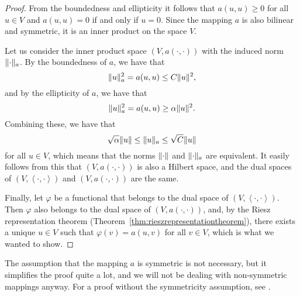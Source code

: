 \documentclass[english, 12pt, a4paper, sci, utf8, a-2b, online]{aaltothesis}
\theoremstyle{definition}
\theoremstyle{plain}
\DeclarePairedDelimiter\norm{\lVert}{\rVert}
\newcommand*{\innerprod}[2]{\left\langle #1, #2 \right\rangle}
\numberwithin{equation}{section}
\begin{document}
\begin{proof}
    From the boundedness and ellipticity it follows that $a(u,u) \geq 0$ for all $u \in V$ and
    $a(u,u) = 0$ if and only if $u=0$.
    Since the mapping $a$ is also bilinear and symmetric, it is
    an inner product on the space $V$.
    
    Let us consider the inner product space $(V, a(\cdot,\cdot))$
    with the induced norm $\norm{\cdot}_a$.
    By the boundedness of $a$, we have that
    \begin{equation*}
        \norm{u}_a^2
        = a(u,u)
        \leq C \norm{u}^2,
    \end{equation*}
    and by the ellipticity of $a$, we have that
    \begin{equation*}
        \norm{u}_a^2
        = a(u,u)
        \geq \alpha \norm{u}^2.
    \end{equation*}
    Combining these, we have that
    \begin{equation*}
        \sqrt{\alpha} \norm{u} \leq \norm{u}_a \leq \sqrt{C} \norm{u}
    \end{equation*}
    for all $u \in V$,
    which means that the norms $\norm{\cdot}$ and $\norm{\cdot}_a$
    are equivalent. It easily follows from this that $(V, a(\cdot,\cdot))$
    is also a Hilbert space, and the dual spaces of
    $(V,\innerprod{\cdot}{\cdot})$ and
    $(V, a(\cdot,\cdot))$ are the same.

    Finally, let $\varphi$ be a functional that belongs to the dual space
    of $(V,\innerprod{\cdot}{\cdot})$. Then $\varphi$ also belongs
    to the dual space of $(V, a(\cdot,\cdot))$,
    and, by the Riesz representation theorem (Theorem~\ref{thm:rieszrepresentationtheorem}),
    there exists a unique
    $u \in V$ such that $\varphi(v) = a(u,v)$ for all $v \in V$,
    which is what we wanted to show.
\end{proof}
The assumption that the mapping $a$ is symmetric is not necessary, but it
simplifies the proof quite a lot, and we will not be dealing with non-symmetric
mappings anyway. For a proof without the symmetricity assumption,
see \cite[Theorem~1 on p.~297]{evans2010}.
\end{document}

